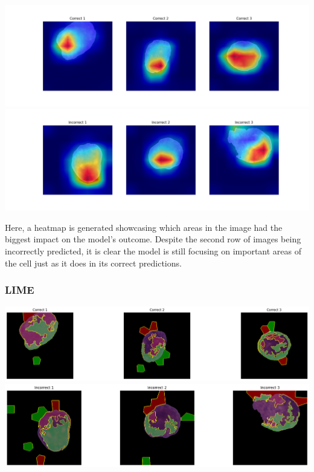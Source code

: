 \documentclass[
	a4paper,
	10pt,
	unnumberedsections,
	twoside,
]{research_article}
\begin{document}
\begin{center}
	\includegraphics[width=\linewidth]{images/dataset1_gradcam_correct.png}
	\includegraphics[width=\linewidth]{images/dataset1_gradcam_incorrect.png}
\end{center}

Here, a  heatmap is generated showcasing which areas in the image had the biggest impact on the model's outcome. Despite the second row of images being incorrectly predicted, it is clear the model is still focusing on important areas of the cell just as it does in its correct predictions.

\newpage
\subsubsection{LIME}

\begin{center}
	\includegraphics[width=\linewidth]{images/dataset1_lime_correct.png}
	\includegraphics[width=\linewidth]{images/dataset1_lime_incorrect.png}
\end{center}
\end{document}
